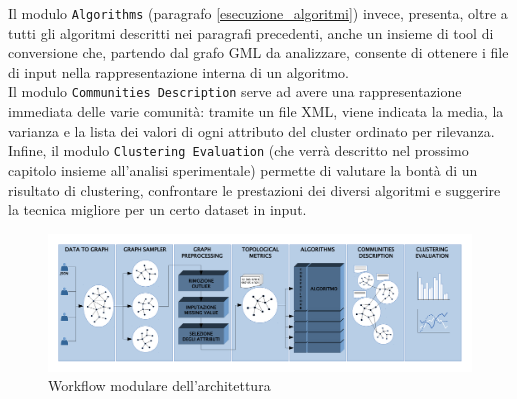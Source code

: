 Il modulo \texttt{Algorithms} (paragrafo \ref{esecuzione_algoritmi}) invece, presenta, oltre a tutti gli algoritmi descritti nei paragrafi precedenti, anche un insieme di tool di conversione che, partendo dal grafo GML da analizzare, consente di ottenere i file di input nella rappresentazione interna di un algoritmo.\\
Il modulo \texttt{Communities Description} serve ad avere una rappresentazione immediata delle varie comunit\`a: tramite un file XML, viene indicata la media, la varianza e la lista dei valori di ogni attributo del cluster ordinato per rilevanza.\\
Infine, il modulo \texttt{Clustering Evaluation} (che verr\`a descritto nel prossimo capitolo insieme all'analisi sperimentale) permette di valutare la bont\`a di un risultato di clustering, confrontare le prestazioni dei diversi algoritmi e suggerire la tecnica migliore per un certo dataset in input. \\
\begin{figure}[h]
    \includegraphics[width=1\textwidth]{pictures/workflow.pdf}
    \caption{Workflow modulare dell'architettura}
    \label{fig:framework_flow}
\end{figure}